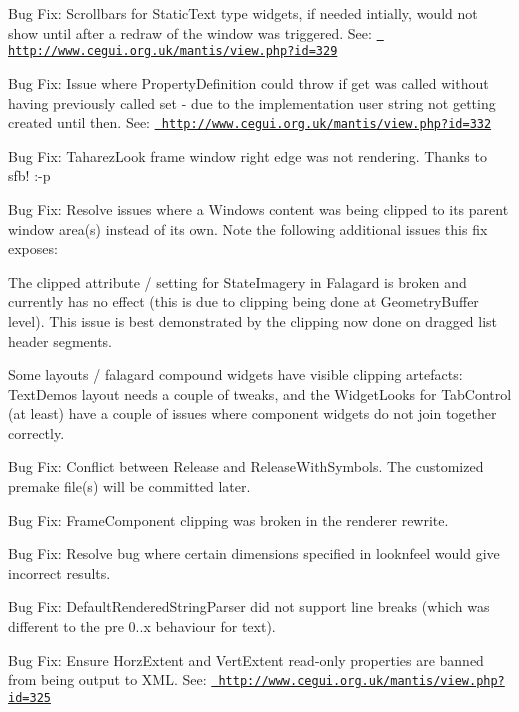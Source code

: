 \begin{DoxyItemize}
\item Bug Fix\+: Scrollbars for Static\+Text type widgets, if needed intially, would not show until after a redraw of the window was triggered. See\+: \href{http://www.cegui.org.uk/mantis/view.php?id=329}{\texttt{ http\+://www.\+cegui.\+org.\+uk/mantis/view.\+php?id=329}}
\item Bug Fix\+: Issue where Property\+Definition could throw if \textquotesingle{}get\textquotesingle{} was called without having previously called \textquotesingle{}set\textquotesingle{} -\/ due to the implementation user string not getting created until then. See\+: \href{http://www.cegui.org.uk/mantis/view.php?id=332}{\texttt{ http\+://www.\+cegui.\+org.\+uk/mantis/view.\+php?id=332}}
\item Bug Fix\+: Taharez\+Look frame window right edge was not rendering. Thanks to sfb! \+:-\/p
\item Bug Fix\+: Resolve issues where a Window\textquotesingle{}s content was being clipped to it\textquotesingle{}s parent window area(s) instead of it\textquotesingle{}s own. Note the following additional issues this fix exposes\+:
\begin{DoxyItemize}
\item The \textquotesingle{}clipped\textquotesingle{} attribute / setting for State\+Imagery in Falagard is broken and currently has no effect (this is due to clipping being done at Geometry\+Buffer level). This issue is best demonstrated by the clipping now done on dragged list header segments.
\item Some layouts / falagard compound widgets have visible clipping artefacts\+: Text\+Demo\textquotesingle{}s layout needs a couple of tweaks, and the Widget\+Looks for Tab\+Control (at least) have a couple of issues where component widgets do not join together correctly.
\end{DoxyItemize}
\item Bug Fix\+: Conflict between Release and Release\+With\+Symbols. The customized premake file(s) will be committed later.
\item Bug Fix\+: Frame\+Component clipping was broken in the renderer rewrite.
\item Bug Fix\+: Resolve bug where certain dimensions specified in looknfeel would give incorrect results.
\item Bug Fix\+: Default\+Rendered\+String\+Parser did not support line breaks (which was different to the pre 0..\+x behaviour for text).
\item Bug Fix\+: Ensure Horz\+Extent and Vert\+Extent read-\/only properties are banned from being output to X\+ML. See\+: \href{http://www.cegui.org.uk/mantis/view.php?id=325}{\texttt{ http\+://www.\+cegui.\+org.\+uk/mantis/view.\+php?id=325}}

\end{DoxyItemize}
